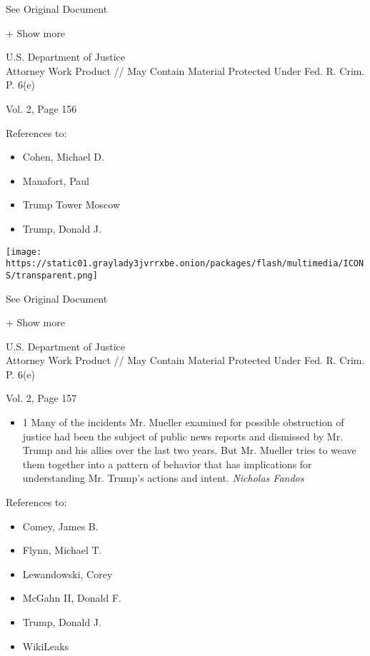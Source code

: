 See Original Document

+ Show more

U.S. Department of Justice\\
Attorney Work Product // May Contain Material Protected Under Fed. R.
Crim. P. 6(e)

Vol. 2, Page 156

References to:

\begin{itemize}
\tightlist
\item
  Cohen, Michael D.
\item
  Manafort, Paul 
\item
  Trump Tower Moscow
\item
  Trump, Donald J.
\end{itemize}

\protect\hyperlink{}{}

\texttt{[image: https://static01.graylady3jvrrxbe.onion/packages/flash/multimedia/ICONS/transparent.png]}

See Original Document

+ Show more

U.S. Department of Justice\\
Attorney Work Product // May Contain Material Protected Under Fed. R.
Crim. P. 6(e)

Vol. 2, Page 157

\begin{itemize}
\tightlist
\item
  1 Many of the incidents Mr. Mueller examined for possible obstruction
  of justice had been the subject of public news reports and dismissed
  by Mr. Trump and his allies over the last two years. But Mr. Mueller
  tries to weave them together into a pattern of behavior that has
  implications for understanding Mr. Trump's actions and intent.
  \emph{Nicholas Fandos}
\end{itemize}

References to:

\begin{itemize}
\tightlist
\item
  Comey, James B.
\item
  Flynn, Michael T.
\item
  Lewandowski, Corey
\item
  McGahn II, Donald F.
\item
  Trump, Donald J.
\item
  WikiLeaks
\end{itemize}

